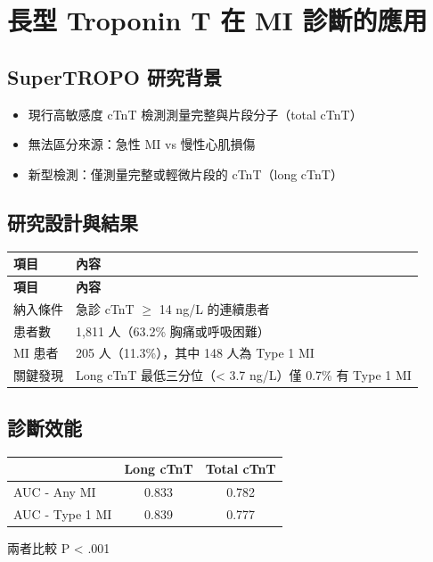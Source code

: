 \documentclass[12pt,a4paper]{article}
\begin{document}

\section{長型 Troponin T 在 MI 診斷的應用}

\subsection{SuperTROPO 研究背景}

\begin{itemize}
    \item 現行高敏感度 cTnT 檢測測量完整與片段分子（total cTnT）
    \item 無法區分來源：急性 MI vs 慢性心肌損傷
    \item 新型檢測：僅測量完整或輕微片段的 cTnT（long cTnT）
\end{itemize}

\subsection{研究設計與結果}

\begin{longtable}{p{4cm}p{10cm}}
\toprule
\textbf{項目} & \textbf{內容} \\
\midrule
\endfirsthead
\midrule
\textbf{項目} & \textbf{內容} \\
\midrule
\endhead
\bottomrule
\endfoot
納入條件 & 急診 cTnT $\geq$ 14 ng/L 的連續患者 \\
\midrule
患者數 & 1,811 人（63.2\% 胸痛或呼吸困難）\\
\midrule
MI 患者 & 205 人（11.3\%），其中 148 人為 Type 1 MI \\
\midrule
關鍵發現 & Long cTnT 最低三分位（< 3.7 ng/L）僅 0.7\% 有 Type 1 MI \\
\bottomrule
\end{longtable}

\subsection{診斷效能}

\begin{center}
\begin{tabular}{lcc}
\toprule
& \textbf{Long cTnT} & \textbf{Total cTnT} \\
\midrule
AUC - Any MI & 0.833 & 0.782 \\
AUC - Type 1 MI & 0.839 & 0.777 \\
\bottomrule
\end{tabular}

\vspace{0.3cm}
兩者比較 P < .001
\end{center}
\end{document}
